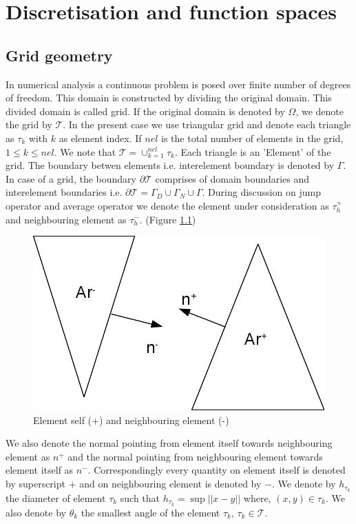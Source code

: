 \documentclass[a4paper]{book}
\begin{document}
\chapter{Discretisation and function spaces}

\section{Grid geometry}

In numerical analysis a continuous problem is posed over finite number of degrees of freedom. This domain is constructed by dividing the original domain. This divided domain is called grid. If the original domain is denoted by $\Omega$, we denote the grid by $\mathcal{T}$. In the present case we use triangular grid and denote each triangle as $\tau_k$ with $k$ as element index. If $nel$ is the total number of elements in the grid, $1\leq k \leq nel$. We note that $\mathcal{T} = \cup_{k=1}^{nel} \tau_k$. Each triangle is an 'Element' of the grid. The boundary betwen elements i.e. interelement boundary is denoted by $\Gamma$. In case of a grid, the boundary $\partial \mathcal{T}$ comprises of domain boundaries and interelement boundaries i.e. $\partial \mathcal{T} = \Gamma_D \cup \Gamma_N \cup \Gamma$. During discussion on jump operator and average operator we denote the element under consideration as $\tau_{h}^+$ and neighbouring element as $\tau_{h}^-$. (Figure \ref{fig:Self_neighbour})

\begin{figure}
\centering
  \includegraphics[width=\linewidth]{ch_3_fig_1.jpg}
  \caption{Element self (+) and neighbouring element (-)}
  \label{fig:Self_neighbour}
\end{figure}

We also denote the normal pointing from element itself towards neighbouring element as $n^+$ and the normal pointing from neighbouring element towards element itself as $n^-$. Correspondingly every quantity on element itself is denoted by superscript $+$ and on neighbouring element is denoted by $-$.  We denote by $h_{\tau_k}$ the diameter of element $\tau_k$ such that $h_{\tau_k} = \sup ||x-y||$ where, $(x,y) \in \tau_k$. We also denote by $\theta_k$ the smallest angle of the element $\tau_k$, $\tau_k \in \mathcal{T}$.
\end{document}
